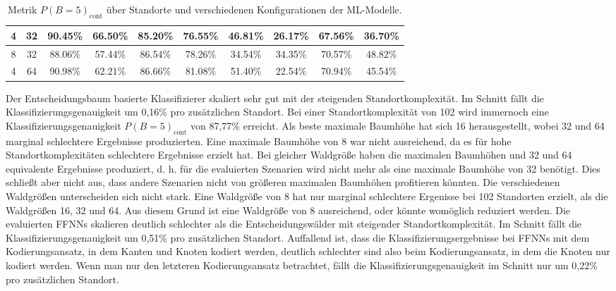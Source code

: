 \begin{table}[h!]
\begin{tabular}{ | c | c | c | c | c | c | c | c | c | c | }
        4 & 32 & 90.45\% & 66.50\% & 85.20\% & 76.55\% & 46.81\% & 26.17\% & 67.56\% & 36.70\% \\\hline
        8 & 32 & 88.06\% & 57.44\% & 86.54\% & 78.26\% & 34.54\% & 34.35\% & 70.57\% & 48.82\% \\\hline
        4 & 64 & 90.98\% & 62.21\% & 86.66\% & 81.08\% & 51.40\% & 22.54\% & 70.94\% & 45.54\% \\\hline
    \end{tabular}
    \caption{Metrik $P(B=5)_{\text{cont}}$ über Standorte und verschiedenen Konfigurationen der ML-Modelle.}
    \label{tab:predictions_by_acc_5_cont}
\end{table}
\newline
\newline
Der Entscheidungsbaum basierte Klassifizierer skaliert sehr gut mit der steigenden Standortkomplexität.
Im Schnitt fällt die Klassifizierungsgenauigkeit um 0,16\% pro zusätzlichen Standort.
Bei einer Standortkomplexität von 102 wird immernoch eine Klassifizierungsgenauigkeit $P(B=5)_{\text{cont}}$ von 87,77\% erreicht.
Als beste maximale Baumhöhe hat sich 16 herausgestellt, wobei 32 und 64 marginal schlechtere Ergebnisse produzierten.
Eine maximale Baumhöhe von 8 war nicht ausreichend, da es für hohe Standortkomplexitäten schlechtere Ergebnisse erzielt hat.
Bei gleicher Waldgröße haben die maximalen Baumhöhen und 32 und 64 equivalente Ergebnisse produziert,
d. h. für die evaluierten Szenarien wird nicht mehr als eine maximale Baumhöhe von 32 benötigt.
Dies schließt aber nicht aus, dass andere Szenarien nicht von größeren maximalen Baumhöhen profitieren könnten.
Die verschiedenen Waldgrößen unterscheiden sich nicht stark.
Eine Waldgröße von 8 hat nur marginal schlechtere Ergenisse bei 102 Standorten erzielt, als die Waldgrößen 16, 32 und 64.
Aus diesem Grund ist eine Waldgröße von 8 ausreichend, oder könnte womöglich reduziert werden.
\newline
\newline
Die evaluierten FFNNs skalieren deutlich schlechter als die Entscheidungswälder mit steigender Standortkomplexität.
Im Schnitt fällt die Klassifizierungsgenauigkeit um 0,51\% pro zusätzlichen Standort.
Auffallend ist, dass die Klassifizierungsergebnisse bei FFNNs mit dem Kodierungsansatz, in dem Kanten und Knoten kodiert werden,
deutlich schlechter sind also beim Kodierungsansatz, in dem die Knoten nur kodiert werden.
Wenn man nur den letzteren Kodierungsansatz betrachtet, fällt die Klassifizierungsgenauigkeit im Schnitt nur um 0,22\% pro zusätzlichen Standort.
